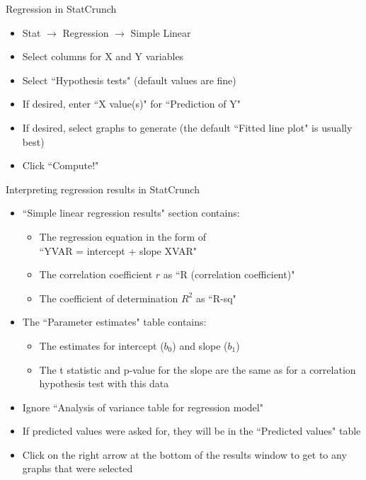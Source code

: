 \documentclass[xcolor=table, handout]{beamer}
\begin{document}
\begin{frame}{Regression in StatCrunch}
\begin{block}{}
\large
\begin{itemize}
\item Stat $\to$ Regression $\to$ Simple Linear
\item Select columns for X and Y variables
\item Select ``Hypothesis tests" (default values are fine)
\item If desired, enter ``X value(s)" for ``Prediction of Y"
\item If desired, select graphs to generate (the default ``Fitted line plot" is usually best)
\item Click ``Compute!"
\end{itemize}
\end{block}
\end{frame}

\begin{frame}{Interpreting regression results in StatCrunch}
\begin{block}{}
\large
\begin{itemize}
\item ``Simple linear regression results" section contains:
\begin{itemize}
\item The regression equation in the form of\\ ``YVAR = intercept + slope XVAR"
\item The correlation coefficient $r$ as ``R (correlation coefficient)"
\item The coefficient of determination $R^2$ as ``R-sq"
\end{itemize}
\item The ``Parameter estimates" table contains:
\begin{itemize}
\item The estimates for intercept ($b_0$) and slope ($b_1$)
\item The t statistic and p-value for the slope are the same as for a correlation hypothesis test with this data
\end{itemize}
\item Ignore ``Analysis of variance table for regression model"
\item If predicted values were asked for, they will be in the ``Predicted values" table
\item Click on the right arrow at the bottom of the results window to get to any graphs that were selected
\end{itemize}
\end{block}
\end{frame}
\end{document}
